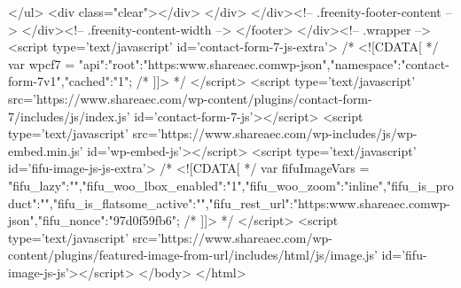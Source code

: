 			</ul>
	<div class="clear"></div>
			</div>
		</div><!-- .freenity-footer-content -->
	</div><!-- .freenity-content-width -->
</footer>
</div><!-- .wrapper -->
<script type='text/javascript' id='contact-form-7-js-extra'>
/* <![CDATA[ */
var wpcf7 = {"api":{"root":"https:\/\/www.shareaec.com\/wp-json\/","namespace":"contact-form-7\/v1"},"cached":"1"};
/* ]]> */
</script>
<script type='text/javascript' src='https://www.shareaec.com/wp-content/plugins/contact-form-7/includes/js/index.js' id='contact-form-7-js'></script>
<script type='text/javascript' src='https://www.shareaec.com/wp-includes/js/wp-embed.min.js' id='wp-embed-js'></script>
<script type='text/javascript' id='fifu-image-js-js-extra'>
/* <![CDATA[ */
var fifuImageVars = {"fifu_lazy":"","fifu_woo_lbox_enabled":"1","fifu_woo_zoom":"inline","fifu_is_product":"","fifu_is_flatsome_active":"","fifu_rest_url":"https:\/\/www.shareaec.com\/wp-json\/","fifu_nonce":"97d0f59fb6"};
/* ]]> */
</script>
<script type='text/javascript' src='https://www.shareaec.com/wp-content/plugins/featured-image-from-url/includes/html/js/image.js' id='fifu-image-js-js'></script>
</body>
</html>
